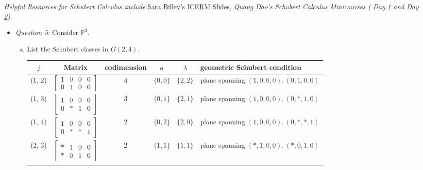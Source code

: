 \textit{Helpful Resources for Schubert Calculus include} 
\href{https://icerm.brown.edu/materials/Slides/sp-s13-off_weeks/Schubert_varieties_and_Schubert_calculus_%5D_Sara_Billey,_University_of_Washington.pdf)}{Sara Billey's ICERM Slides}, \textit{Quang Dao's Schubert Calculus Minicourses (
\href{https://quangvdao.github.io/schubert-calculus-minicourse/day1.pdf}{Day 1} and 
\href{https://quangvdao.github.io/schubert-calculus-minicourse/day2.pdf}{Day 2})}.

\begin{itemize}
    \item \textit{Question 5: } Consider $\mathbb{P}^3$. 

    \begin{enumerate}[a)]
        \item List the Schubert classes in $G(2, 4)$.

        \begin{tabular}{c | c | c | c | c | L}
        $j$ & Matrix & codimension & $a$ & $\lambda$ & geometric Schubert condition\\ \hline   
        
        \rule{0pt}{4ex}    

        (1, 2) & $\begin{bmatrix}
        1 & 0 & 0 & 0 \\
        0 & 1 & 0 & 0
        \end{bmatrix}$ & 4 & $\{0, 0\}$ & $\{2, 2\}$ & plane spanning $(1, 0, 0, 0), (0, 1, 0, 0)$ \\ \hline    
        \rule{0pt}{4ex}    

        (1, 3) & $\begin{bmatrix}
        1 & 0 & 0 & 0 \\
        0 & \ast & 1 & 0
        \end{bmatrix}$ & 3 & $\{0, 1\}$ & $\{2, 1\}$ & plane spanning $(1, 0, 0, 0), (0, \ast, 1, 0)$ \\ \hline \rule{0pt}{4ex}    

        (1, 4) & $\begin{bmatrix}
        1 & 0 & 0 & 0 \\
        0 & \ast & \ast & 1
        \end{bmatrix}$ & 2 & $\{0, 2\}$ & $\{2, 0\}$ & plane spanning $(1, 0, 0, 0), (0, \ast, \ast, 1)$ \\ \hline \rule{0pt}{4ex}    

        (2, 3) & $\begin{bmatrix}
        \ast & 1 & 0 & 0 \\
        \ast & 0 & 1 & 0
        \end{bmatrix}$ & 2 & $\{1, 1\}$ & $\{1, 1\}$ & plane spanning $(\ast, 1, 0, 0), (\ast, 0, 1, 0)$ \\ \hline \rule{0pt}{4ex}    


\end{tabular}
\end{enumerate}
\end{itemize}
